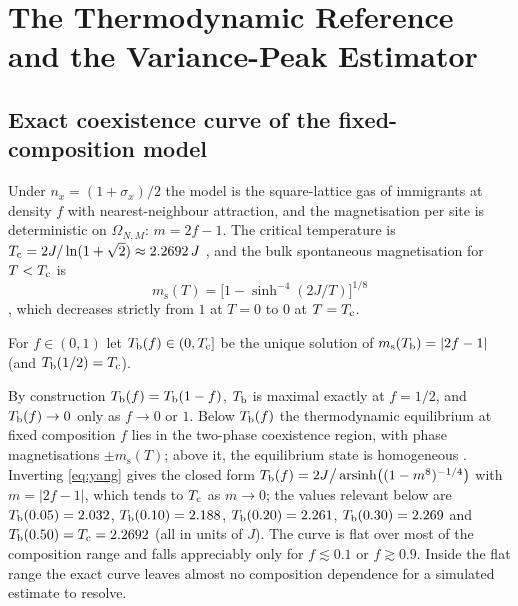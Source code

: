 \section{The Thermodynamic Reference and the Variance-Peak Estimator}
\label{sec:thermo}

\subsection{Exact coexistence curve of the fixed-composition model}
Under $n_x=(1+\sigma_x)/2$ the model is the square-lattice gas of immigrants at density $f$ with nearest-neighbour attraction, and the magnetisation per site is deterministic on $\Omega_{N,M}$: $m=2f-1$. The critical temperature is $T_{\mathrm c}=2J/\ln(1+\sqrt2)\approx 2.2692\,J$ \citep{onsager1944}, and the bulk spontaneous magnetisation for $T<T_{\mathrm c}$ is
\begin{equation}
m_{\mathrm s}(T)=\big[1-\sinh^{-4}(2J/T)\big]^{1/8}
\label{eq:yang}
\end{equation}
\citep{yang1952}, which decreases strictly from $1$ at $T=0$ to $0$ at $T=T_{\mathrm c}$.
\begin{definition}[Binodal]\label{def:binodal}
For $f\in(0,1)$ let $T_{\mathrm b}(f)\in(0,T_{\mathrm c}]$ be the unique solution of $m_{\mathrm s}(T_{\mathrm b})=|2f-1|$ (and $T_{\mathrm b}(1/2)=T_{\mathrm c}$).
\end{definition}
By construction $T_{\mathrm b}(f)=T_{\mathrm b}(1-f)$, $T_{\mathrm b}$ is maximal exactly at $f=1/2$, and $T_{\mathrm b}(f)\to0$ only as $f\to0$ or $1$. Below $T_{\mathrm b}(f)$ the thermodynamic equilibrium at fixed composition $f$ lies in the two-phase coexistence region, with phase magnetisations $\pm m_{\mathrm s}(T)$; above it, the equilibrium state is homogeneous \citep{rowlinson1982}. Inverting \eqref{eq:yang} gives the closed form $T_{\mathrm b}(f)=2J\big/\operatorname{arsinh}\!\big((1-m^{8})^{-1/4}\big)$ with $m=|2f-1|$, which tends to $T_{\mathrm c}$ as $m\to0$; the values relevant below are $T_{\mathrm b}(0.05)=2.032$, $T_{\mathrm b}(0.10)=2.188$, $T_{\mathrm b}(0.20)=2.261$, $T_{\mathrm b}(0.30)=2.269$ and $T_{\mathrm b}(0.50)=T_{\mathrm c}=2.2692$ (all in units of $J$). The curve is flat over most of the composition range and falls appreciably only for $f\lesssim0.1$ or $f\gtrsim0.9$. Inside the flat range the exact curve leaves almost no composition dependence for a simulated estimate to resolve.

